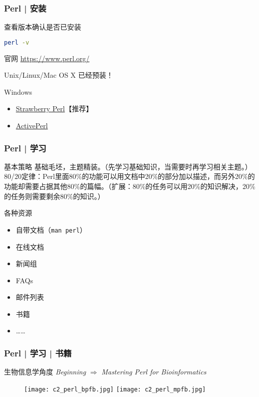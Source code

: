 \begin{frame}[fragile]
  \frametitle{Perl | 安装}
  \begin{block}{\alert{查看版本}确认是否已安装}
\begin{lstlisting}[language=bash]
perl -v
\end{lstlisting}
  \end{block}
  \pause
  \begin{block}{官网}
    \href{https://www.perl.org/}{https://www.perl.org/}
  \end{block}
  \pause
  \begin{block}{Unix/Linux/Mac OS X}
    已经预装！
  \end{block}
  \pause
  \begin{block}{Windows}
    \begin{itemize}
      \item \href{http://strawberryperl.com/}{Strawberry Perl}【推荐】
      \item \href{http://www.activestate.com/activeperl/downloads}{ActivePerl}
    \end{itemize}
  \end{block}
\end{frame}

\begin{frame}[fragile]
  \frametitle{Perl | 学习}
  \begin{block}{基本策略}
    基础毛坯，主题精装。（先学习基础知识，当需要时再学习相关主题。）\\
80/20定律：Perl里面80\%的功能可以用文档中20\%的部分加以描述，而另外20\%的功能却需要占据其他80\%的篇幅。（扩展：80\%的任务可以用20\%的知识解决，20\%的任务则需要剩余80\%的知识。）
  \end{block}
  \pause
  \begin{block}{各种资源}
    \begin{itemize}
      \item 自带文档（\verb|man perl|）
      \item 在线文档
      \item 新闻组
      \item FAQs
      \item 邮件列表
      \item 书籍
      \item ……
    \end{itemize}
  \end{block}
\end{frame}

\begin{frame}
  \frametitle{Perl | 学习 | 书籍}
  \begin{block}{生物信息学角度}
    \textit{\alert{Beginning}} $\Longrightarrow$ \textit{Mastering Perl for Bioinformatics}
  \end{block}
  \begin{figure}
    \centering
    \texttt{[image: c2\_perl\_bpfb.jpg]}
    \hspace{1em}
    \texttt{[image: c2\_perl\_mpfb.jpg]}
  \end{figure}
\end{frame}

